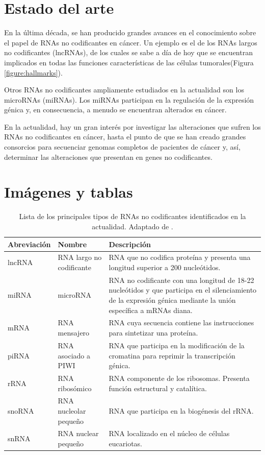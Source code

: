\documentclass[a4paper,11pt]{article}
\begin{document}
\section{Estado del arte}

En la última década, se han producido grandes avances en el conocimiento sobre el papel de RNAs no codificantes en cáncer. Un ejemplo es el de los RNAs largos no codificantes (lncRNAs), de los cuales se sabe a día de hoy que se encuentran implicados en todas las funciones características de las células tumorales\cite{Schmitt2016}(Figura \ref{figure:hallmarks}).

Otros RNAs no codificantes ampliamente estudiados en la actualidad son los microRNAs (miRNAs). Los miRNAs participan en la regulación de la expresión génica y, en consecuencia, a menudo se encuentran alterados en cáncer\cite{Medina2008}.

En la actualidad, hay un gran interés por investigar las alteraciones que sufren los RNAs no codificantes en cáncer, hasta el punto de que se han creado grandes consorcios para secuenciar genomas completos de pacientes de cáncer y, así, determinar las alteraciones que presentan en genes no codificantes\cite{Khurana2016}.


\section{Imágenes y tablas}

\begin{table}[h!]
\begin{tabular}{p{2cm}p{5cm}p{9cm}}
\textbf{Abreviación} & \textbf{Nombre} & \textbf{Descripción} \\
\hline
lncRNA & RNA largo no codificante & RNA que no codifica proteína y presenta una longitud superior a 200 nucleótidos. \\
miRNA & microRNA & RNA no codificante con una longitud de 18-22 nucleótidos y que participa en el silenciamiento de la expresión génica mediante la unión específica a mRNAs diana. \\
mRNA & RNA mensajero & RNA cuya secuencia contiene las instrucciones para sintetizar una proteína. \\
piRNA & RNA asociado a PIWI & RNA que participa en la modificación de la cromatina para reprimir la transcripción génica. \\
rRNA & RNA ribosómico & RNA componente de los ribosomas. Presenta función estructural y catalítica. \\
snoRNA & RNA nucleolar pequeño & RNA que participa en la biogénesis del rRNA. \\
snRNA & RNA nuclear pequeño & RNA localizado en el núcleo de células eucariotas. \\
\hline
\end{tabular}
\caption{Lista de los principales tipos de RNAs no codificantes identificados en la actualidad. Adaptado de \cite{Cech2014}.}
\label{table:ncRNAs}
\end{table}
\end{document}
